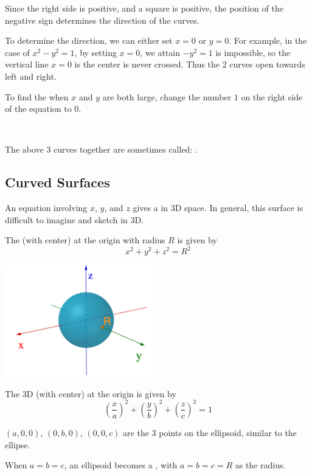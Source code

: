 \documentclass[11pt,fleqn]{book} %
\begin{document}
Since the right side is positive, and a square is positive, the position of the negative sign determines the direction of the curves.

To determine the direction, we can either set $x = 0$ or $y = 0$. For example, in the case of $x^2 - y^2 = 1$, by setting $x = 0$, we attain $-y^2 = 1$ is impossible, so the vertical line $x = 0$ is the center is never crossed. Thus the 2 curves open towards left and right.

To find the  when $x$ and $y$ are both large, change the number $1$ on the right side of the equation to $0$.

{~~~}

The above 3 curves together are sometimes called: .

\subsection{Curved Surfaces}

An equation involving $x$, $y$, and $z$ gives a  in 3D space. In general, this surface is difficult to imagine and sketch in 3D.

\begin{definition}[3D Sphere]
    The  (with center) at the origin with radius $R$ is given by $$x^2 + y^2 + z^2 = R^2$$
\end{definition}

\begin{center} \includegraphics[width=0.5\textwidth]{Plots/sphere.png} \end{center}

\begin{definition}[Ellipsoid]
    The 3D  (with center) at the origin is given by $$\left(\frac{x}{a}\right)^2 + \left(\frac{y}{b}\right)^2 + \left(\frac{z}{c}\right)^2 = 1$$

    $(a, 0, 0)$, $(0, b, 0)$, $(0, 0, c)$ are the 3 points on the ellipsoid, similar to the ellipse.

    When $a = b = c$, an ellipsoid becomes a , with $a = b = c = R$ as the radius.
\end{definition}
\end{document}
